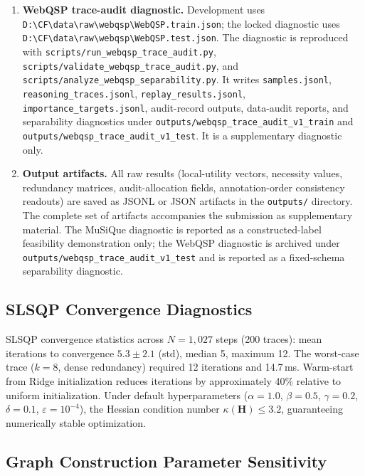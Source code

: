 \documentclass[a4paper,fleqn]{cas-sc}
\begin{document}
\begin{enumerate}
\item \textbf{WebQSP trace-audit diagnostic.} Development uses \texttt{D:\textbackslash CF\textbackslash data\textbackslash raw\textbackslash webqsp\textbackslash WebQSP.train.json}; the locked diagnostic uses \texttt{D:\textbackslash CF\textbackslash data\textbackslash raw\textbackslash webqsp\textbackslash WebQSP.test.json}. The diagnostic is reproduced with \texttt{scripts/run\_webqsp\_trace\_audit.py}, \texttt{scripts/validate\_webqsp\_trace\_audit.py}, and \texttt{scripts/analyze\_webqsp\_separability.py}. It writes \texttt{samples.jsonl}, \texttt{reasoning\_traces.jsonl}, \texttt{replay\_results.jsonl}, \texttt{importance\_targets.jsonl}, audit-record outputs, data-audit reports, and separability diagnostics under \texttt{outputs/webqsp\_trace\_audit\_v1\_train} and \texttt{outputs/webqsp\_trace\_audit\_v1\_test}. It is a supplementary diagnostic only.
\item \textbf{Output artifacts.} All raw results (local-utility vectors, necessity values, redundancy matrices, audit-allocation fields, annotation-order consistency readouts) are saved as JSONL or JSON artifacts in the \texttt{outputs/} directory. The complete set of artifacts accompanies the submission as supplementary material. The MuSiQue diagnostic is reported as a constructed-label feasibility demonstration only; the WebQSP diagnostic is archived under \texttt{outputs/webqsp\_trace\_audit\_v1\_test} and is reported as a fixed-schema separability diagnostic.
\end{enumerate}

\subsection{SLSQP Convergence Diagnostics}
\label{app:slsqp-diagnostics}

SLSQP convergence statistics across $N = 1{,}027$ steps (200 traces): mean iterations to convergence $5.3 \pm 2.1$ (std), median 5, maximum 12. The worst-case trace ($k=8$, dense redundancy) required 12 iterations and 14.7\,ms. Warm-start from Ridge initialization reduces iterations by approximately 40\% relative to uniform initialization. Under default hyperparameters ($\alpha=1.0$, $\beta=0.5$, $\gamma=0.2$, $\delta=0.1$, $\varepsilon=10^{-4}$), the Hessian condition number $\kappa(\mathbf{H}) \le 3.2$, guaranteeing numerically stable optimization.

\subsection{Graph Construction Parameter Sensitivity}
\label{app:graph-sensitivity}
\end{document}
